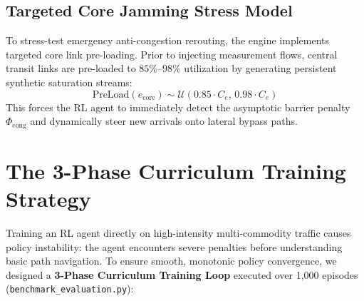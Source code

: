 \subsection{Targeted Core Jamming Stress Model}
To stress-test emergency anti-congestion rerouting, the engine implements targeted core link pre-loading. Prior to injecting measurement flows, central transit links are pre-loaded to $85\%$--$98\%$ utilization by generating persistent synthetic saturation streams:
\begin{equation}
    \text{PreLoad}(e_{\text{core}}) \sim \mathcal{U}(0.85 \cdot C_e, \, 0.98 \cdot C_e)
\end{equation}
This forces the RL agent to immediately detect the asymptotic barrier penalty $\Phi_{\text{cong}}$ and dynamically steer new arrivals onto lateral bypass paths.

\section{The 3-Phase Curriculum Training Strategy}
Training an RL agent directly on high-intensity multi-commodity traffic causes policy instability: the agent encounters severe penalties before understanding basic path navigation. To ensure smooth, monotonic policy convergence, we designed a \textbf{3-Phase Curriculum Training Loop} executed over 1,000 episodes (\texttt{benchmark\_evaluation.py}):

